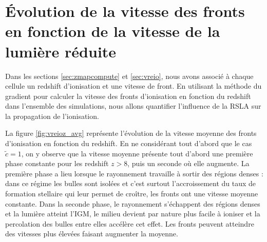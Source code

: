 


\section[Vitesse des fronts]{Évolution de la vitesse des fronts en fonction de la vitesse de la lumière réduite}
\label{sec:compfrontspeep}

Dans les sections \ref{sec:zmapcompute} et \ref{sec:vreio}, nous avons associé à chaque cellule un redshift d'ionisation et une vitesse de front.
En utilisant la méthode du gradient pour calculer la vitesse des fronts d'ionisation en fonction du redshift dans l'ensemble des simulations, nous allons quantifier l'influence de la \ac{RSLA} sur la propagation de l'ionisation.


La figure \ref{fig:vreioz_avg} représente l'évolution de la vitesse moyenne des fronts d'ionisation en fonction du redshift.
En ne considérant tout d'abord que le cas  $\tilde{c}=1$, on y observe que la vitesse moyenne présente tout d'abord une première phase constante pour les redshift $z>8$, puis un seconde où elle augmente.
La première phase a lieu lorsque le rayonnement travaille à sortir des régions denses : dans ce régime les bulles sont isolées et c'est surtout l'accroissement du taux de formation stellaire qui leur permet de croître, les fronts ont une vitesse moyenne constante.
Dans la seconde phase, le rayonnement s'échappent des régions denses et la lumière atteint l'\ac{IGM}, le milieu devient par nature plus facile à ioniser et la percolation des bulles entre elles accélère cet effet.
Les fronts peuvent atteindre des vitesses plus élevées faisant augmenter la moyenne.

